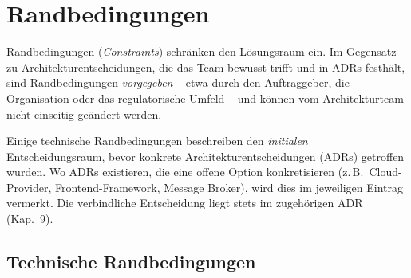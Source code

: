 \section{Randbedingungen}
\label{sec:randbedingungen}

Randbedingungen (\emph{Constraints}) schränken den Lösungsraum ein.
Im Gegensatz zu Architekturentscheidungen, die das Team bewusst trifft
und in ADRs\footnotemark{} festhält, sind Randbedingungen
\emph{vorgegeben} -- etwa durch den Auftraggeber, die Organisation
oder das regulatorische Umfeld -- und können vom Architekturteam
nicht einseitig geändert werden.

\begin{hinweis}
Einige technische Randbedingungen beschreiben den \emph{initialen}
Entscheidungsraum, bevor konkrete Architekturentscheidungen (ADRs)
getroffen wurden. Wo ADRs existieren, die eine offene Option
konkretisieren (z.\,B.\ Cloud-Provider, Frontend-Framework,
Message Broker), wird dies im jeweiligen Eintrag vermerkt.
Die verbindliche Entscheidung liegt stets im zugehörigen ADR
(Kap.~9).
\end{hinweis}


\subsection{Technische Randbedingungen}
\label{sec:randbedingungen-technisch}

